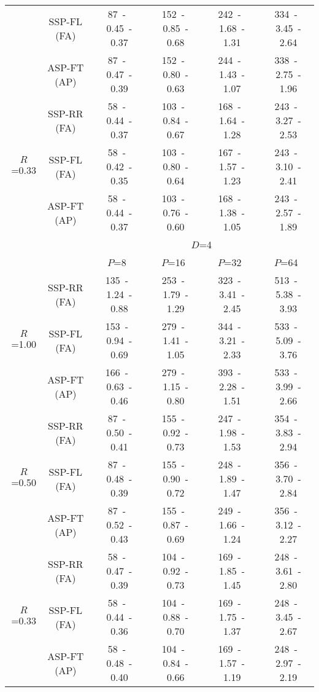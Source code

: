 \documentclass[10pt,twocolumn,journal]{IEEEtran}
\begin{document}
\begin{table*}[t!]
{\begin{tabular}{|c|c|c|c|c|c|}
& SSP-FL (FA) & 87~-~0.45~-~0.37 & 152~-~0.85~-~0.68 & 242~-~1.68~-~1.31 & 334~-~3.45~-~2.64 \\
& ASP-FT (AP) & 87~-~0.47~-~0.39 & 152~-~0.80~-~0.63 & 244~-~1.43~-~1.07 & 338~-~2.75~-~1.96 \\
\hline
\multirow{3}{*}{$R$=0.33} & SSP-RR (FA) & 58~-~0.44~-~0.37 & 103~-~0.84~-~0.67 & 168~-~1.64~-~1.28 & 243~-~3.27~-~2.53 \\
& SSP-FL (FA) & 58~-~0.42~-~0.35 & 103~-~0.80~-~0.64 & 167~-~1.57~-~1.23 & 243~-~3.10~-~2.41 \\
& ASP-FT (AP) & 58~-~0.44~-~0.37 & 103~-~0.76~-~0.60 & 168~-~1.38~-~1.05 & 243~-~2.57~-~1.89 \\
\hline
\hline
& 	 & \multicolumn{4}{c|}{$D$=4} \\
\hline
& 	 & $P$=8 & $P$=16 & $P$=32 & $P$=64 \\
\hline
\multirow{3}{*}{$R$=1.00} & SSP-RR (FA) & 135~-~1.24~-~0.88 & 253~-~1.79~-~1.29 & 323~-~3.41~-~2.45 & 513~-~5.38~-~3.93 \\
& SSP-FL (FA) & 153~-~0.94~-~0.69 & 279~-~1.41~-~1.05 & 344~-~3.21~-~2.33 & 533~-~5.09~-~3.76 \\
& ASP-FT (AP) & 166~-~0.63~-~0.46 & 279~-~1.15~-~0.80 & 393~-~2.28~-~1.51 & 533~-~3.99~-~2.66 \\
\hline
\multirow{3}{*}{$R$=0.50} & SSP-RR (FA) & 87~-~0.50~-~0.41 & 155~-~0.92~-~0.73 & 247~-~1.98~-~1.53 & 354~-~3.83~-~2.94 \\
& SSP-FL (FA) & 87~-~0.48~-~0.39 & 155~-~0.90~-~0.72 & 248~-~1.89~-~1.47 & 356~-~3.70~-~2.84 \\
& ASP-FT (AP) & 87~-~0.52~-~0.43 & 155~-~0.87~-~0.69 & 249~-~1.66~-~1.24 & 356~-~3.12~-~2.27 \\
\hline
\multirow{3}{*}{$R$=0.33} & SSP-RR (FA) & 58~-~0.47~-~0.39 & 104~-~0.92~-~0.73 & 169~-~1.85~-~1.45 & 248~-~3.61~-~2.80 \\
& SSP-FL (FA) & 58~-~0.44~-~0.36 & 104~-~0.88~-~0.70 & 169~-~1.75~-~1.37 & 248~-~3.45~-~2.67 \\
& ASP-FT (AP) & 58~-~0.48~-~0.40 & 104~-~0.84~-~0.66 & 169~-~1.57~-~1.19 & 248~-~2.97~-~2.19 \\
\hline
\end{tabular}
}
\end{table*}
\end{document}
